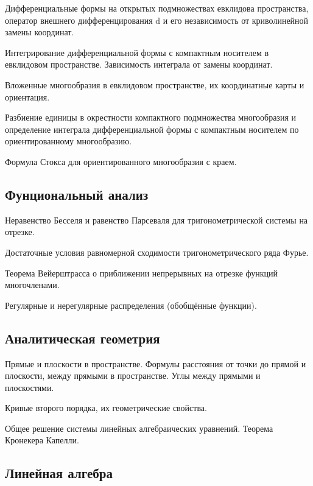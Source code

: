 \begin{enumerate*}
\item  Дифференциальные формы на открытых подмножествах евклидова пространства, оператор внешнего дифференцирования d и его независимость от криволинейной замены координат.
\item Интегрирование дифференциальной формы с компактным носителем в евклидовом пространстве. Зависимость интеграла от замены координат.
\item Вложенные многообразия в евклидовом пространстве, их координатные карты и ориентация.
\item Разбиение единицы в окрестности компактного подмножества многообразия и определение интеграла дифференциальной формы с компактным носителем по ориентированному многообразию.
\item Формула Стокса для ориентированного многообразия с краем.




\subsection*{Фунциональный анализ}

\item Неравенство Бесселя и равенство Парсеваля для тригонометрической системы на отрезке.
\item Достаточные условия равномерной сходимости тригонометрического ряда Фурье.
\item Теорема Вейерштрасса о приближении непрерывных на отрезке функций многочленами.
\item Регулярные и нерегулярные распределения (обобщённые функции).


\newpage


\subsection*{Аналитическая геометрия}

\item Прямые и плоскости в пространстве. Формулы расстояния от точки до прямой и плоскости, между прямыми в пространстве. Углы между прямыми и плоскостями.
\item Кривые второго порядка, их геометрические свойства.
\item Общее решение системы линейных алгебраических уравнений. Теорема Кронекера Капелли.



\subsection*{Линейная алгебра}


\end{enumerate*}
